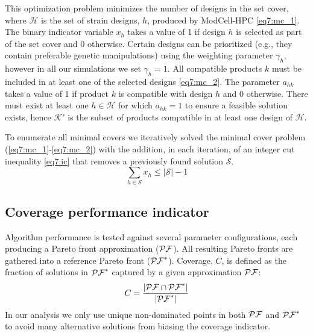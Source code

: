 {This optimization problem minimizes the number of designs in the set cover, where $\mathcal{H}$ is the set of strain designs, $h$, produced by ModCell-HPC \eqref{eq7:mc_1}.
The binary indicator variable $x_h$ takes a value of 1 if design $h$ is selected as part of the set cover and 0 otherwise.
Certain designs can be prioritized (e.g., they contain preferable genetic manipulations) using the weighting parameter $\gamma_h$, however in all our simulations we set $\gamma_h = 1$. All compatible products $k$ must be included in at least one of the selected designs \eqref{eq7:mc_2}. The parameter $a_{hk}$ takes a value of 1 if product $k$ is compatible with design $h$ and 0 otherwise. There must exist at least one $h \in \mathcal{H}$ for which $a_{hk} = 1$ to ensure a feasible solution exists, hence $\mathcal{K'}$ is the subset of products compatible in at least one design of $\mathcal{H}$.

To enumerate all minimal covers we iteratively solved the minimal cover problem (\ref{eq7:mc_1}-\ref{eq7:mc_2}) with the addition, in each iteration, of an integer cut inequality \eqref{eq7:ic} that removes a previously found solution $\mathcal{S}$.
\begin{equation}
    \sum_{h\in\mathcal{S}} x_h \le |\mathcal{S}|  - 1 \label{eq7:ic}
\end{equation}

\subsection{Coverage performance indicator} \label{sec:coverage_metric}
Algorithm performance is tested against several parameter configurations, each producing a Pareto front approximation ($\mathcal{PF}$). All resulting Pareto fronts are gathered into a reference Pareto front ($\mathcal{PF}^*$).
Coverage, $C$, is defined as the fraction of solutions in $\mathcal{PF}^*$ captured by a given approximation $\mathcal{PF}$:
\begin{equation}
    C = \frac{|\mathcal{PF} \cap \mathcal{PF}^*|}{|\mathcal{PF}^*|}
\end{equation}
In our analysis we only use unique non-dominated points in both $\mathcal{PF}$ and $\mathcal{PF}^*$ to avoid many alternative solutions from biasing the coverage indicator.

}
